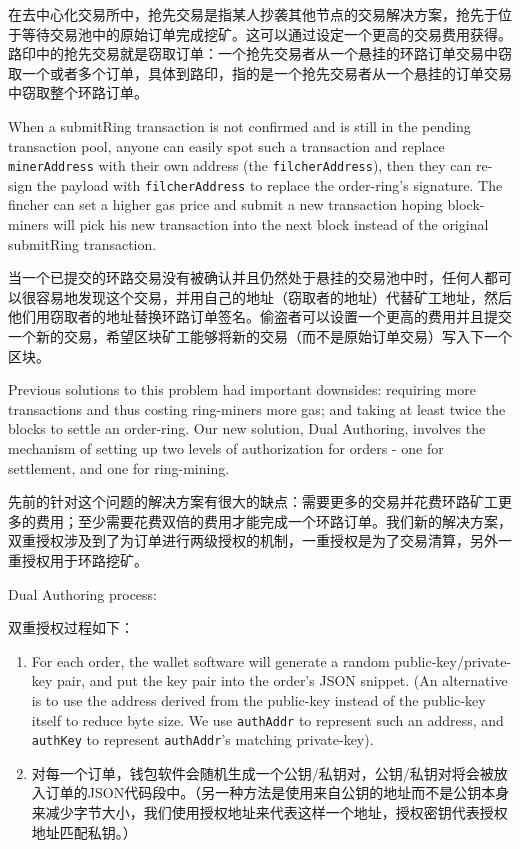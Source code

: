 \documentclass[UTF8,nofonts]{ctexart}
\begin{document}
\begin{multicols}{2}
在去中心化交易所中，抢先交易是指某人抄袭其他节点的交易解决方案，抢先于位于等待交易池中的原始订单完成挖矿。这可以通过设定一个更高的交易费用获得。路印中的抢先交易就是窃取订单：一个抢先交易者从一个悬挂的环路订单交易中窃取一个或者多个订单，具体到路印，指的是一个抢先交易者从一个悬挂的订单交易中窃取整个环路订单。


When a submitRing transaction is not confirmed and is still in the pending transaction pool, anyone can easily spot such a transaction and replace \verb|minerAddress| with their own address (the \verb|filcherAddress|), then they can re-sign the payload with \verb|filcherAddress| to replace the order-ring's signature. The fincher can set a higher gas price and submit a new transaction hoping block-miners will pick his new transaction into the next block instead of the original submitRing transaction.

当一个已提交的环路交易没有被确认并且仍然处于悬挂的交易池中时，任何人都可以很容易地发现这个交易，并用自己的地址（窃取者的地址）代替矿工地址，然后他们用窃取者的地址替换环路订单签名。偷盗者可以设置一个更高的费用并且提交一个新的交易，希望区块矿工能够将新的交易（而不是原始订单交易）写入下一个区块。


Previous solutions to this problem had important downsides: requiring more transactions and thus costing ring-miners more gas; and taking at least twice the blocks to settle an order-ring.  Our new solution, Dual Authoring\cite{dualauthor}, involves the mechanism of setting up two levels of authorization for orders - one for settlement, and one for ring-mining.

先前的针对这个问题的解决方案有很大的缺点：需要更多的交易并花费环路矿工更多的费用；至少需要花费双倍的费用才能完成一个环路订单。我们新的解决方案，双重授权涉及到了为订单进行两级授权的机制，一重授权是为了交易清算，另外一重授权用于环路挖矿。

Dual Authoring process:

双重授权过程如下：


\begin{enumerate}

	\item For each order, the wallet software will generate a random public-key/private-key pair, and put the key pair into the order's JSON snippet. (An alternative is to use the address derived from the public-key instead of the public-key itself to reduce byte size. We use \verb|authAddr| to represent such an address, and \verb|authKey| to represent \verb|authAddr|'s matching private-key).
	\item 对每一个订单，钱包软件会随机生成一个公钥/私钥对，公钥/私钥对将会被放入订单的JSON代码段中。（另一种方法是使用来自公钥的地址而不是公钥本身来减少字节大小，我们使用授权地址来代表这样一个地址，授权密钥代表授权地址匹配私钥。）



\end{enumerate}
\end{multicols}
\end{document}
